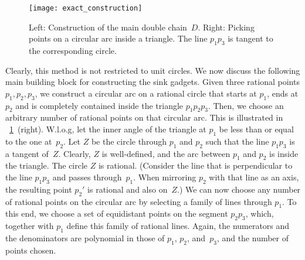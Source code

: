 \documentclass[a4paper,11pt]{article}
\begin{document}
\begin{figure}
\centering
\texttt{[image: exact\_construction]}
\caption{Left: Construction of the main double chain~$D$.
Right: Picking points on a circular arc inside a triangle. The line $p_1 p_3$ is tangent to the corresponding circle.}
\label{fig_exact_construction}
\end{figure}


Clearly, this method is not restricted to unit circles.
We now discuss the following main building block for constructing the sink gadgets.
Given three rational points $p_1, p_2, p_3$, we construct a circular arc on a rational circle that starts at $p_1$, ends at $p_2$ and is completely contained inside the triangle $p_1 p_2 p_3$.
Then, we choose an arbitrary number of rational points on that circular arc.
This is illustrated in \figurename~\ref{fig_exact_construction}~(right).
W.l.o.g, let the inner angle of the triangle at $p_1$ be less than or equal to the one at~$p_2$.
Let $Z$ be the circle through $p_1$ and $p_2$ such that the line $p_1 p_3$ is a tangent of~$Z$.
Clearly, $Z$ is well-defined, and the arc between $p_1$ and $p_2$ is inside the triangle.
The circle $Z$ is rational.
(Consider the line that is perpendicular to the line $p_1 p_3$ and passes through~$p_1$.
When mirroring $p_2$ with that line as an axis, the resulting point $p_2'$ is rational and also on~$Z$.)
We can now choose any number of rational points on the circular arc by selecting a family of lines through $p_1$.
To this end, we choose a set of equidistant points on the segment $p_2 p_3$, which, together with $p_1$ define this family of rational lines.
Again, the numerators and the denominators are polynomial in those of $p_1$, $p_2$, and~$p_3$, and the number of points chosen.
\end{document}
